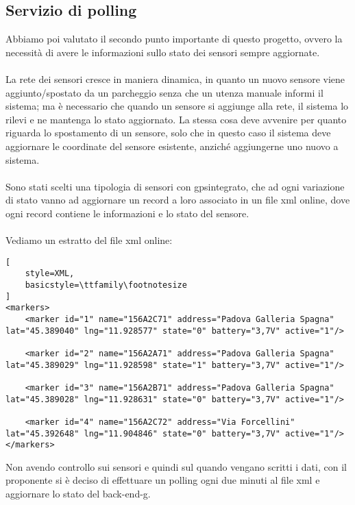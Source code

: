 \subsection{Servizio di polling}
Abbiamo poi valutato il secondo punto importante di questo progetto, ovvero
la necessità di avere le informazioni sullo stato dei sensori sempre aggiornate.
\\\\
La rete dei sensori cresce in maniera dinamica, in quanto un nuovo sensore viene aggiunto/spostato
da un parcheggio senza che un utenza manuale informi il sistema; ma è necessario che quando un sensore si 
aggiunge alla rete, il sistema lo rilevi e ne mantenga lo stato
aggiornato. La stessa cosa deve avvenire per quanto riguarda lo spostamento di un sensore, solo che in 
questo caso il sistema deve aggiornare le coordinate del sensore esistente, anziché aggiungerne uno nuovo a sistema.
\\\\
Sono stati scelti una tipologia di sensori con \gls{gps}\glsfirstoccur integrato, che ad ogni variazione di stato vanno ad 
aggiornare un record a loro associato in un file \gls{xml} online, dove ogni record contiene le informazioni e
lo stato del sensore.
\\\\
Vediamo un estratto del file \gls{xml} online:
\begin{lstlisting}[
    style=XML,
    basicstyle=\ttfamily\footnotesize
]
<markers>
    <marker id="1" name="156A2C71" address="Padova Galleria Spagna" lat="45.389040" lng="11.928577" state="0" battery="3,7V" active="1"/>
    
    <marker id="2" name="156A2A71" address="Padova Galleria Spagna" lat="45.389029" lng="11.928598" state="1" battery="3,7V" active="1"/>
    
    <marker id="3" name="156A2B71" address="Padova Galleria Spagna" lat="45.389028" lng="11.928631" state="0" battery="3,7V" active="1"/>
    
    <marker id="4" name="156A2C72" address="Via Forcellini" lat="45.392648" lng="11.904846" state="0" battery="3,7V" active="1"/>
</markers>
\end{lstlisting}
\leavevmode\newline
Non avendo controllo sui sensori e quindi sul quando vengano scritti i dati, con il proponente si è deciso
di effettuare un polling ogni due minuti al file \gls{xml} e aggiornare lo stato del \gls{back-end-g}.
\\\\
